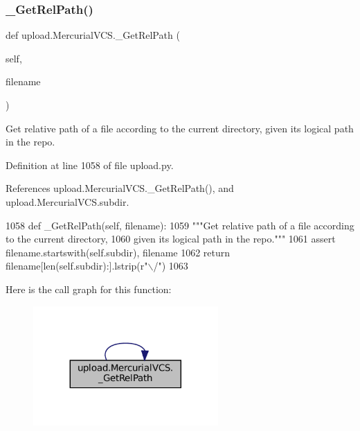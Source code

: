 \subsubsection{\texorpdfstring{\+\_\+\+Get\+Rel\+Path()}{\_GetRelPath()}\hspace{0.1cm}{\footnotesize\ttfamily [2/2]}}
{\footnotesize\ttfamily def upload.\+Mercurial\+V\+C\+S.\+\_\+\+Get\+Rel\+Path (\begin{DoxyParamCaption}\item[{}]{self,  }\item[{}]{filename }\end{DoxyParamCaption})\hspace{0.3cm}{\ttfamily [private]}}

\begin{DoxyVerb}Get relative path of a file according to the current directory,
given its logical path in the repo.\end{DoxyVerb}
 

Definition at line 1058 of file upload.\+py.



References upload.\+Mercurial\+V\+C\+S.\+\_\+\+Get\+Rel\+Path(), and upload.\+Mercurial\+V\+C\+S.\+subdir.


\begin{DoxyCode}
1058   \textcolor{keyword}{def }\_GetRelPath(self, filename):
1059     \textcolor{stringliteral}{"""Get relative path of a file according to the current directory,}
1060 \textcolor{stringliteral}{    given its logical path in the repo."""}
1061     \textcolor{keyword}{assert} filename.startswith(self.subdir), filename
1062     \textcolor{keywordflow}{return} filename[len(self.subdir):].lstrip(\textcolor{stringliteral}{r"\(\backslash\)/"})
1063 
\end{DoxyCode}
Here is the call graph for this function\+:
\nopagebreak
\begin{figure}[H]
\begin{center}
\leavevmode
\includegraphics[width=200pt]{classupload_1_1MercurialVCS_a140da653b63106c4fa825f3ef5bf7701_cgraph}
\end{center}
\end{figure}
\mbox{\label{classupload_1_1MercurialVCS_a6c05746012d8cd435c94ace1465671ef}} 
